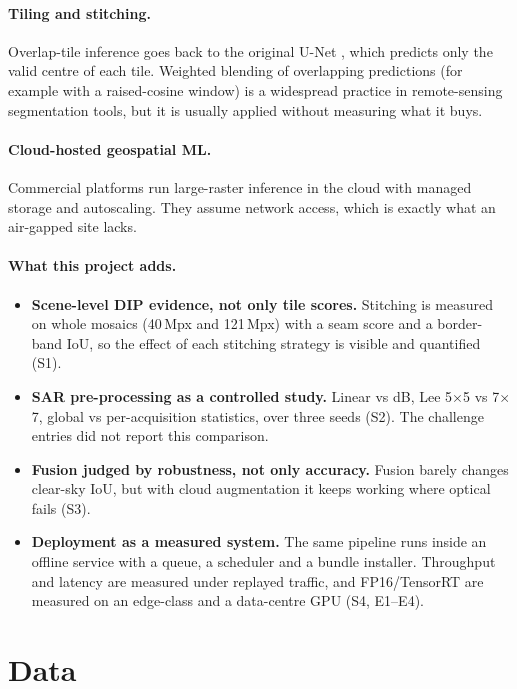 \documentclass[11pt,a4paper]{article}
\begin{document}
\paragraph{Tiling and stitching.}
Overlap-tile inference goes back to the original U-Net \cite{ronneberger2015unet}, which
predicts only the valid centre of each tile. Weighted blending of overlapping predictions
(for example with a raised-cosine window) is a widespread practice in remote-sensing
segmentation tools, but it is usually applied without measuring what it buys.

\paragraph{Cloud-hosted geospatial ML.}
Commercial platforms run large-raster inference in the cloud with managed storage and
autoscaling. They assume network access, which is exactly what an air-gapped site lacks.

\paragraph{What this project adds.}
\begin{itemize}
\item \textbf{Scene-level DIP evidence, not only tile scores.} Stitching is measured on whole
mosaics (40\,Mpx and 121\,Mpx) with a seam score and a border-band IoU, so the effect of each
stitching strategy is visible and quantified (S1).
\item \textbf{SAR pre-processing as a controlled study.} Linear vs dB, Lee 5$\times$5 vs
7$\times$7, global vs per-acquisition statistics, over three seeds (S2). The challenge
entries did not report this comparison.
\item \textbf{Fusion judged by robustness, not only accuracy.} Fusion barely changes clear-sky
IoU, but with cloud augmentation it keeps working where optical fails (S3).
\item \textbf{Deployment as a measured system.} The same pipeline runs inside an offline
service with a queue, a scheduler and a bundle installer. Throughput and latency are
measured under replayed traffic, and FP16/TensorRT are measured on an edge-class and a
data-centre GPU (S4, E1--E4).
\end{itemize}

\section{Data}
\label{sec:data}
\end{document}
